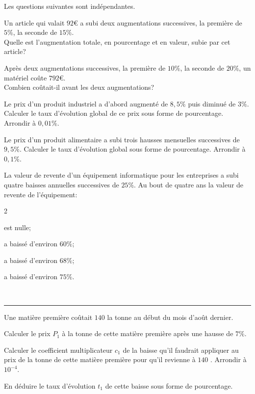 \documentclass[a4paper,10pt]{book}        %
\begin{document}
Les questions suivantes sont indépendantes.
\begin{enumMet}
	\item Un article qui valait $92 €$ a subi deux augmentations successives, la première de $5 \%$, la seconde de $15 \%$.\\
	Quelle est l'augmentation totale, en pourcentage et en valeur, subie par cet article?
	\item Après deux augmentations successives, la première de $10 \%$, la seconde de $20 \%$, un matériel coûte $792 €$.\\
	Combien coûtait-il avant les deux augmentations?
	\item Le prix d'un produit industriel a d'abord augmenté de $8,5 \%$ puis diminué de $3 \%$. Calculer le taux d'évolution global de ce prix sous forme de pourcentage. Arrondir à $0,01 \%$.
	\item Le prix d'un produit alimentaire a subi trois hausses mensuelles successives de $9,5 \%$. Calculer le taux d'évolution global sous forme de pourcentage. Arrondir à $0,1 \%$.
	\item La valeur de revente d'un équipement informatique pour les entreprises a subi quatre baisses annuelles successives de $25 \%$. Au bout de quatre ans la valeur de revente de l'équipement:
	\begin{multicols}{2}
		\begin{enumMet}
		\item est nulle;
		\item a baissé d'environ $60 \%$;
		\item a baissé d'environ $68 \%$;
		\item a baissé d'environ $75 \%$.
	\end{enumMet}
	\end{multicols}
	
\end{enumMet}

\ \\
\mbox{}\hfill\rule{0.8\linewidth}{1pt}\hfill\mbox{}


Une matière première coûtait $140$ \EUR{} la tonne au début du mois d'août dernier.

\begin{enumMet}
	\item Calculer le prix $P_{1}$ à la tonne de cette matière première après une hausse de $7 \%$.
	\item \begin{enumMet}
		\item Calculer le coefficient multiplicateur $c_{1}$ de la baisse qu'il faudrait appliquer au prix de la tonne de cette matière première pour qu'il revienne à $140$ \EUR{}. Arrondir à $10^{-4}$.
		\item En déduire le taux d'évolution $t_{1}$ de cette baisse sous forme de pourcentage.
	\end{enumMet}
\end{enumMet}
\end{document}
